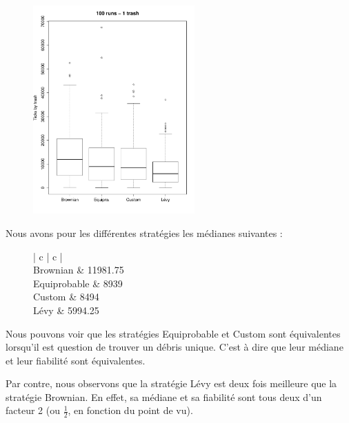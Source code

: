 

\begin{figure}[H]
	\begin{center}
		\includegraphics[height=8cm]{diagrams/1Tr_all.pdf}
		\caption{}
		\label{fig:1Trash}
	\end{center}
\end{figure}


Nous avons pour les différentes stratégies les médianes suivantes :

\begin{figure}[H]
	\begin{center}
		\begin{tabular}{ | c | c | }
			\hline
			 \\
			\hline
			Brownian & 11981.75 \\
			Equiprobable & 8939 \\
			Custom & 8494 \\
			Lévy & 5994.25 \\
			\hline
		\end{tabular}
	\end{center}
\end{figure}


Nous pouvons voir que les stratégies Equiprobable et Custom sont
équivalentes lorsqu'il est question de trouver un débris unique.
C'est à dire que leur médiane et leur fiabilité sont équivalentes.

Par contre, nous observons que la stratégie Lévy est deux fois
meilleure que la stratégie Brownian. En effet, sa médiane et sa
fiabilité sont tous deux d'un facteur 2 (ou $\frac{1}{2}$, en fonction du
point de vu).



